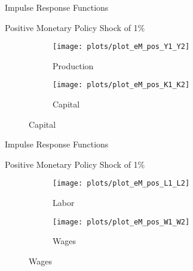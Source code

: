 \documentclass[../quali_slides.tex]{subfiles}
\begin{document}

\begin{frame}{Impulse Response Functions}

\center Positive Monetary Policy Shock of 1\%
	
	\begin{figure}[h!]
		\centering
		\begin{subfigure}[b]{0.45\textwidth}
			\centering
			\texttt{[image: plots/plot\_eM\_pos\_Y1\_Y2]}
			\caption{\scriptsize Production}
			\label{fig:plot_eM_pos_Y1_Y2}
		\end{subfigure}
		\hspace*{0.3cm}
		\begin{subfigure}[b]{0.45\textwidth}
			\centering
			\texttt{[image: plots/plot\_eM\_pos\_K1\_K2]}
			\caption{\scriptsize Capital}
			\label{fig:plot_eM_pos_K1_K2}
		\end{subfigure}
	\end{figure}
	
\end{frame}


\begin{frame}{Impulse Response Functions}

\center Positive Monetary Policy Shock of 1\%
	
	\begin{figure}[h!]
		\centering
		\begin{subfigure}[b]{0.45\textwidth}
			\centering
			\texttt{[image: plots/plot\_eM\_pos\_L1\_L2]}
			\caption{\scriptsize Labor}
			\label{fig:plot_eM_pos_L1_L2}
		\end{subfigure}
		\hspace*{0.3cm}
		\begin{subfigure}[b]{0.45\textwidth}
			\centering
			\texttt{[image: plots/plot\_eM\_pos\_W1\_W2]}
			\caption{\scriptsize Wages}
			\label{fig:plot_eM_pos_W1_W2}
		\end{subfigure}
	\end{figure}
	
\end{frame}

\end{document}
